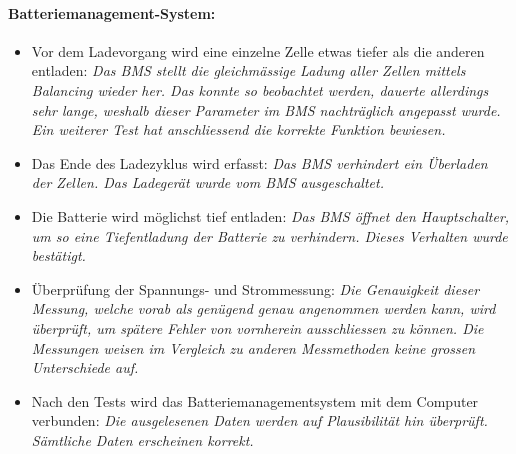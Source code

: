 \paragraph{Batteriemanagement-System:} \begin{itemize}
	\item Vor dem Ladevorgang wird eine einzelne Zelle etwas tiefer als die anderen entladen: \textit{Das BMS stellt die gleichmässige Ladung aller Zellen mittels Balancing wieder her. Das konnte so beobachtet werden, dauerte allerdings sehr lange, weshalb dieser Parameter im BMS nachträglich angepasst wurde. Ein weiterer Test hat anschliessend die korrekte Funktion bewiesen.}
	\item Das Ende des Ladezyklus wird erfasst: \textit{Das BMS verhindert ein Überladen der Zellen. Das Ladegerät wurde vom BMS ausgeschaltet.}
	\item Die Batterie wird möglichst tief entladen: \textit{Das BMS öffnet den Hauptschalter, um so eine Tiefentladung der Batterie zu verhindern. Dieses Verhalten wurde bestätigt.}
\newpage
	\item Überprüfung der Spannungs- und Strommessung: \textit{Die Genauigkeit dieser Messung, welche vorab als genügend genau angenommen werden kann, wird überprüft, um spätere Fehler von vornherein ausschliessen zu können. Die Messungen weisen im Vergleich zu anderen Messmethoden keine grossen Unterschiede auf.}
	\item Nach den Tests wird das Batteriemanagementsystem mit dem Computer verbunden: \textit{Die ausgelesenen Daten werden auf Plausibilität hin überprüft. Sämtliche Daten erscheinen korrekt.}
\end{itemize}\color{black}


\newpage
